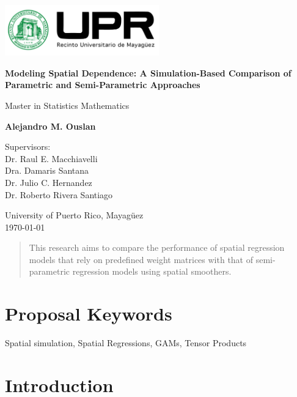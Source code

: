 \documentclass{article}
\begin{document}
\begin{titlepage}
	\centering
	\vspace*{1cm}

	\includegraphics[width=0.5\textwidth]{assets/logo.png}\par\vspace{1cm} %

	\Huge
	\textbf{Modeling Spatial Dependence: A Simulation-Based Comparison of Parametric and Semi-Parametric Approaches}

	\vspace{0.5cm}
	\LARGE
	Master in Statistics Mathematics

	\vspace{1.5cm}

	\textbf{Alejandro M. Ouslan}

	\vfill

	\Large
	Supervisors: \\
	Dr. Raul E. Macchiavelli \\
	Dra. Damaris Santana \\
	Dr. Julio C. Hernandez \\
	Dr. Roberto Rivera Santiago

	\vspace{0.8cm}

	\Large
	University of Puerto Rico, Mayagüez \\
	{\small \today}

\end{titlepage}

\newpage

\begin{abstract}
	This research aims to compare the performance of spatial regression models that rely on predefined weight matrices with that of semi-parametric regression models using spatial smoothers.
\end{abstract}

\section{Proposal Keywords}
Spatial simulation, Spatial Regressions, GAMs, Tensor Products

\section{Introduction}
\end{document}
